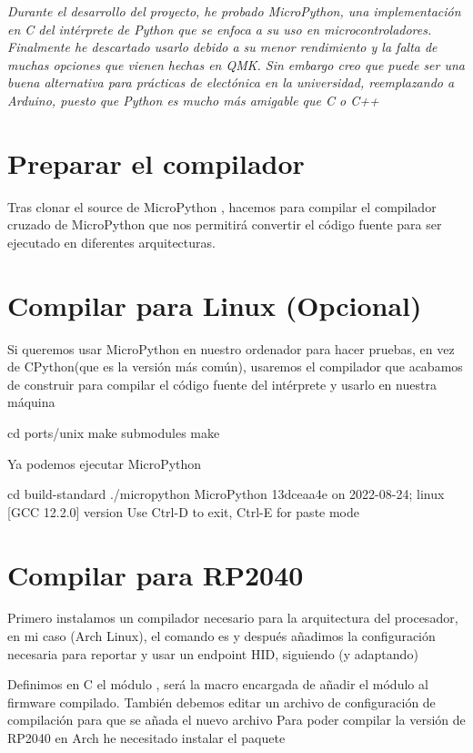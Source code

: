 {\itshape\Large Durante el desarrollo del proyecto, he probado MicroPython\cite{micropython}, una implementación en C del intérprete de Python que se enfoca a su uso en microcontroladores. Finalmente he descartado usarlo debido a su menor rendimiento y la falta de muchas opciones que vienen hechas en QMK. Sin embargo creo que puede ser una buena alternativa para prácticas de electónica en la universidad, reemplazando a Arduino, puesto que Python es mucho más amigable que C o C++}

\section{Preparar el compilador}
Tras clonar el source de MicroPython , hacemos  para compilar el compilador cruzado de MicroPython que nos permitirá convertir el código fuente para ser ejecutado en diferentes arquitecturas.

\section{Compilar para Linux (Opcional)}
Si queremos usar MicroPython en nuestro ordenador para hacer pruebas, en vez de CPython(que es la versión más común), usaremos el compilador que acabamos de construir para compilar el código fuente del intérprete y usarlo en nuestra máquina 
\begin{multicli}
  \cliarrow cd ports/unix \newline
  \cliarrow make submodules \newline
  \cliarrow make
\end{multicli}

Ya podemos ejecutar MicroPython
\begin{multicli}
  \cliarrow cd build-standard \newline
  \cliarrow ./micropython \newline
  MicroPython 13dceaa4e on 2022-08-24; linux [GCC 12.2.0] version \newline
  Use Ctrl-D to exit, Ctrl-E for paste mode
\end{multicli}

\section{Compilar para RP2040}
Primero instalamos un compilador necesario para la arquitectura del procesador, en mi caso (Arch Linux), el comando es  y después añadimos la configuración necesaria para reportar y usar un endpoint HID, siguiendo (y adaptando) \cite{tusb-rp2} \par
Definimos en C el módulo \cite{mod-usb-hid}, será  la macro encargada de añadir el módulo al firmware compilado.
También debemos editar un archivo de configuración de compilación para que se añada el nuevo archivo 
Para poder compilar la versión de RP2040 en Arch he necesitado instalar el paquete \newline
{} \newline

